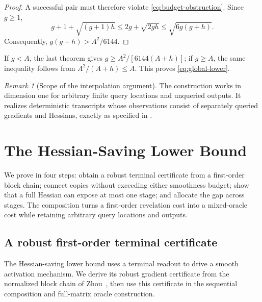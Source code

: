 \documentclass[11pt]{article}
\theoremstyle{remark}
\newtheorem{remark}[theorem]{Remark}
\theoremstyle{remark}
\newtheorem{remark}[remark]{Remark}
\begin{document}
\begin{proof}
A successful pair must therefore violate \eqref{eq:budget-obstruction}. Since $g\ge1$,
\[
 g+1+\sqrt{(g+1)h}
 \le2g+\sqrt{2gh}\le\sqrt{6g(g+h)}.
\]
Consequently, $g(g+h)>A^2/6144$.
\end{proof}

If $g<A$, the last theorem gives $g\ge A^2/[6144(A+h)]$; if $g\ge A$, the same inequality follows from $A^2/(A+h)\le A$. This proves \eqref{eq:global-lower}.

\begin{remark}[Scope of the interpolation argument]
The construction works in dimension one for arbitrary finite query locations and unqueried outputs. It realizes deterministic transcripts whose observations consist of separately queried gradients and Hessians, exactly as specified in .
\end{remark}

\section{The Hessian-Saving Lower Bound}\label{sec:poor}
We prove  in four steps: obtain a robust terminal certificate from a first-order block chain; connect copies without exceeding either smoothness budget; show that a full Hessian can expose at most one stage; and allocate the gap across stages. The composition turns a first-order revelation cost into a mixed-oracle cost while retaining arbitrary query locations and outputs.

\subsection{A robust first-order terminal certificate}
\label{sec:robust-gadget}
The Hessian-saving lower bound uses a terminal readout to drive a smooth activation mechanism. We derive its robust gradient certificate from the normalized block chain of Zhou~\cite{zhou}, then use this certificate in the sequential composition and full-matrix oracle construction.
\end{document}
